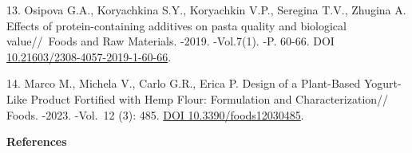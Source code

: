 \begin{refs}
13. Osipova G.A., Koryachkina S.Y., Koryachkin V.P., Seregina T.V.,
Zhugina A. Effects of protein-containing additives on pasta quality and
biological value//~Foods and Raw Materials. -2019. -Vol.7(1). -P.
60-66. DOI
\href{http://doi.org/10.21603/2308-4057-2019-1-60-66}{10.21603/2308-4057-2019-1-60-66}.

14. Marco M., Michela V., Carlo G.R., Erica P. Design of a Plant-Based
Yogurt-Like Product Fortified with Hemp Flour: Formulation and
Characterization// Foods. -2023. -Vol.~12 (3): 485.
\href{https://doi.org/10.3390/foods12030485}{DOI 10.3390/foods12030485}.
\end{refs}

\begin{center}
{\bfseries References}
\end{center}

